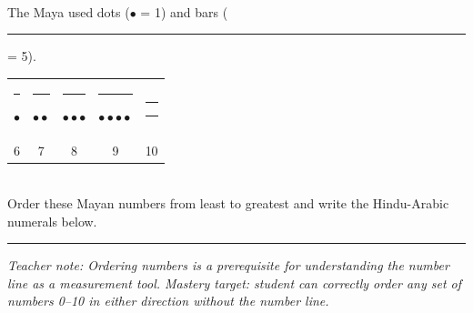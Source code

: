 \documentclass[12pt,letterpaper]{article}
\begin{document}
\vfill
{}\\[4pt]
The Maya used dots ($\bullet$ = 1) and bars (\rule{0.7cm}{2pt} = 5).\\[4pt]
\begin{tabular}{ccccc}
\rule{0.7cm}{2pt}$\bullet$ &
\rule{0.7cm}{2pt}$\bullet\bullet$ &
\rule{0.7cm}{2pt}$\bullet\bullet\bullet$ &
\rule{0.7cm}{2pt}$\bullet\bullet\bullet\bullet$ &
\rule{0.7cm}{2pt}\rule{0.7cm}{2pt}\\[2pt]
6 & 7 & 8 & 9 & 10
\end{tabular}\\[4pt]
Order these Mayan numbers from least to greatest and write the Hindu-Arabic numerals below.

\vspace{4pt}\hrule\vspace{3pt}
{\footnotesize\color{gray}\textit{Teacher note: Ordering numbers is a prerequisite for understanding
  the number line as a measurement tool. Mastery target: student can correctly
  order any set of numbers 0–10 in either direction without the number line.}}
\end{document}
